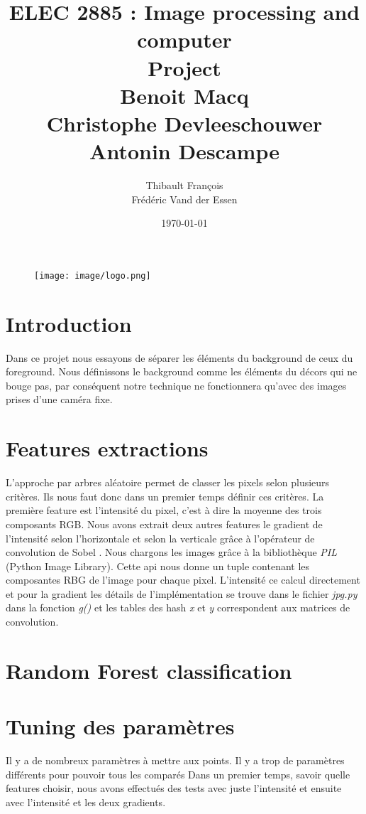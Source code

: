 \documentclass[11pt,a4paper]{report}
\title{ELEC 2885 : Image processing and computer  \\ Project \\
Benoit Macq \\ Christophe Devleeschouwer \\ Antonin Descampe}
\author{Thibault François \\ Frédéric Vand der Essen}
\date{\today}
\begin{document}
	\begin{titlepage}		
		\begin{figure}[tbp]
			\begin{center}
				\texttt{[image: image/logo.png]}
			\end{center}
		\end{figure}
		\maketitle
	\end{titlepage}

\section{Introduction}
Dans ce projet nous essayons de séparer les éléments du background de ceux du foreground. Nous définissons le background comme les éléments du décors
qui ne bouge pas, par conséquent notre technique ne fonctionnera qu'avec des images prises d'une caméra fixe. 

\section{Features extractions}
L'approche par arbres aléatoire permet de classer les pixels selon plusieurs critères. Ils nous faut donc dans un premier temps définir ces critères. La première feature est l'intensité du pixel, c'est à dire la moyenne des trois composants RGB. Nous avons extrait deux autres features le gradient de l'intensité selon l'horizontale et selon la verticale \cite{gradient} grâce à l'opérateur de convolution de Sobel \cite{sobel}. Nous chargons les images grâce à la bibliothèque \textit{PIL} (Python Image Library). Cette api nous donne un tuple contenant les composantes RBG de l'image pour chaque pixel. L'intensité ce calcul directement et pour la gradient les détails de l'implémentation se trouve dans le fichier \textit{jpg.py} dans la fonction \textit{g()} et les tables des hash \textit{x} et \textit{y} correspondent aux matrices de convolution.  


\section{Random Forest classification}

\section{Tuning des paramètres}
Il y a de nombreux paramètres à mettre aux points. Il y a trop de paramètres différents pour pouvoir tous les comparés  Dans un premier temps, savoir quelle features choisir, nous avons effectués des tests avec juste l'intensité et ensuite avec l'intensité et les deux gradients. 
\end{document}
